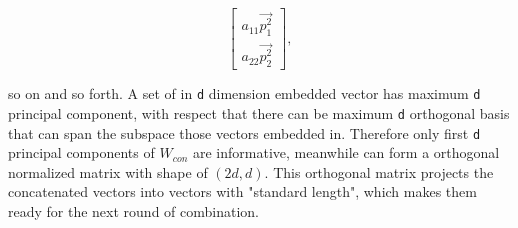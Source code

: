   \[\begin{bmatrix}
      a_{11}\vec{p^2_1}\\
      a_{22}\vec{p^2_2}
    \end{bmatrix},\]

  so on and so forth. A set of in \verb|d| dimension embedded vector has maximum \verb|d| principal component, with respect that there can be maximum \verb|d| orthogonal basis that can span the subspace those vectors embedded in. Therefore only first \verb|d| principal components of $W_{con}$ are informative, meanwhile can form a orthogonal normalized matrix with shape of $(2d, d)$. This orthogonal matrix projects the concatenated vectors into vectors with "standard length", which makes them ready for the next round of combination.
